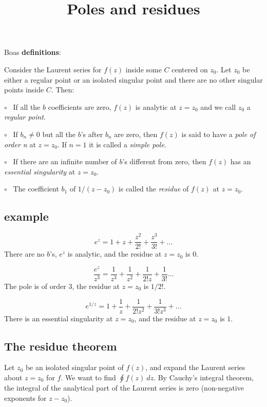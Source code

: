 \documentclass[11pt, oneside]{article}
\title{Poles and residues}
\date{}
\begin{document}
\maketitle
\Large


Boas \textbf{definitions}:

Consider the Laurent series for $f(z)$ inside some $C$ centered on $z_0$.  Let $z_0$ be either a regular point or an isolated singular point and there are no other singular points inside $C$.  Then:

$\circ$ \ If all the $b$ coefficients are zero, $f(z)$ is analytic at $z = z_0$ and we call $z_0$ a \emph{regular point}.

$\circ$ \ If $b_n \ne 0$ but all the $b$'s after $b_n$ are zero, then $f(z)$ is said to have a \emph{pole of order n} at $z = z_0$.  If $n=1$ it is called a \emph{simple pole}.

$\circ$ \ If there are an infinite number of $b$'s different from zero, then $f(z)$ has an \emph{essential singularity} at $z = z_0$.

$\circ$ \ The coefficient $b_1$ of $1/(z - z_0)$ is called the \emph{residue} of $f(z)$ at $z = z_0$.

\subsection*{example}

\[ e^z = 1 + z + \frac{z^2}{2!} + \frac{z^3}{3!} + \dots \]
There are no $b$'s, $e^z$ is analytic, and the residue at $z = z_0$ is $0$.

\[ \frac{e^z}{z^3} = \frac{1}{z^3} + \frac{1}{z^2} + \frac{1}{2!z} + \frac{1}{3!} \dots \]
The pole is of order $3$, the residue at $z = z_0$ is $1/2!$.

\[ e^{1/z} = 1 + \frac{1}{z} + \frac{1}{2!z^2} + \frac{1}{3!z^3} + \dots \]
There is an essential singularity at $z = z_0$, and the residue at $z = z_0$ is $1$.

\subsection*{The residue theorem}

Let $z_0$ be an isolated singular point of $f(z)$, and expand the Laurent series about $z = z_0$ for $f$.  We want to find $\oint f(z) \ dz$.  By Cauchy's integral theorem, the integral of the analytical part of the Laurent series is zero (non-negative exponents for $z - z_0$).
\end{document}

